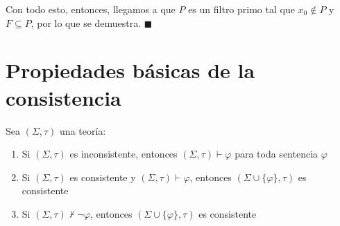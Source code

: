 \documentclass{article}
\begin{document}
Con todo esto, entonces, llegamos a que $P$ es un filtro primo tal que $x_0\notin P$ y $F\subseteq P$, por lo que se demuestra. $\blacksquare$

\section*{Propiedades básicas de la consistencia}
Sea $(\Sigma,\tau)$ una teoría:
\begin{enumerate}
  \item Si $(\Sigma,\tau)$ es inconsistente, entonces $(\Sigma,\tau)\vdash\varphi$ para toda sentencia $\varphi$
  \item Si $(\Sigma,\tau)$ es consistente y $(\Sigma,\tau)\vdash\varphi$, entonces $(\Sigma\cup\{\varphi\},\tau)$ es consistente
  \item Si $(\Sigma,\tau)\nvdash\neg\varphi$, entonces $(\Sigma\cup\{\varphi\},\tau)$ es consistente
\end{enumerate}
\end{document}
